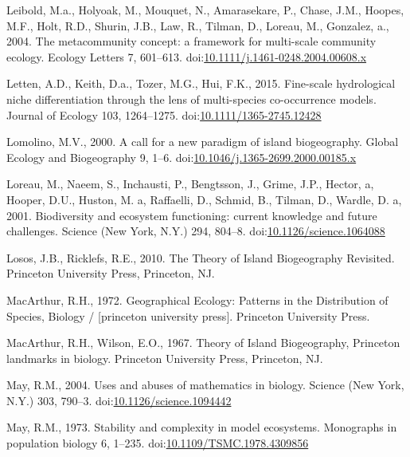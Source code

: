 \hypertarget{ref-Leibold2004}{}
Leibold, M.a., Holyoak, M., Mouquet, N., Amarasekare, P., Chase, J.M.,
Hoopes, M.F., Holt, R.D., Shurin, J.B., Law, R., Tilman, D., Loreau, M.,
Gonzalez, a., 2004. The metacommunity concept: a framework for
multi-scale community ecology. Ecology Letters 7, 601--613.
doi:\href{https://doi.org/10.1111/j.1461-0248.2004.00608.x}{10.1111/j.1461-0248.2004.00608.x}

\hypertarget{ref-Letten2015}{}
Letten, A.D., Keith, D.a., Tozer, M.G., Hui, F.K., 2015. Fine-scale
hydrological niche differentiation through the lens of multi-species
co-occurrence models. Journal of Ecology 103, 1264--1275.
doi:\href{https://doi.org/10.1111/1365-2745.12428}{10.1111/1365-2745.12428}

\hypertarget{ref-Lomolino2000}{}
Lomolino, M.V., 2000. A call for a new paradigm of island biogeography.
Global Ecology and Biogeography 9, 1--6.
doi:\href{https://doi.org/10.1046/j.1365-2699.2000.00185.x}{10.1046/j.1365-2699.2000.00185.x}

\hypertarget{ref-Loreau2001}{}
Loreau, M., Naeem, S., Inchausti, P., Bengtsson, J., Grime, J.P.,
Hector, a, Hooper, D.U., Huston, M. a, Raffaelli, D., Schmid, B.,
Tilman, D., Wardle, D. a, 2001. Biodiversity and ecosystem functioning:
current knowledge and future challenges. Science (New York, N.Y.) 294,
804--8.
doi:\href{https://doi.org/10.1126/science.1064088}{10.1126/science.1064088}

\hypertarget{ref-Losos2010}{}
Losos, J.B., Ricklefs, R.E., 2010. The Theory of Island Biogeography
Revisited. Princeton University Press, Princeton, NJ.

\hypertarget{ref-macarthur1972geographical}{}
MacArthur, R.H., 1972. Geographical Ecology: Patterns in the
Distribution of Species, Biology / {[}princeton university press{]}.
Princeton University Press.

\hypertarget{ref-MacArthur1967}{}
MacArthur, R.H., Wilson, E.O., 1967. Theory of Island Biogeography,
Princeton landmarks in biology. Princeton University Press, Princeton,
NJ.

\hypertarget{ref-May2004}{}
May, R.M., 2004. Uses and abuses of mathematics in biology. Science (New
York, N.Y.) 303, 790--3.
doi:\href{https://doi.org/10.1126/science.1094442}{10.1126/science.1094442}

\hypertarget{ref-May1973}{}
May, R.M., 1973. Stability and complexity in model ecosystems.
Monographs in population biology 6, 1--235.
doi:\href{https://doi.org/10.1109/TSMC.1978.4309856}{10.1109/TSMC.1978.4309856}

